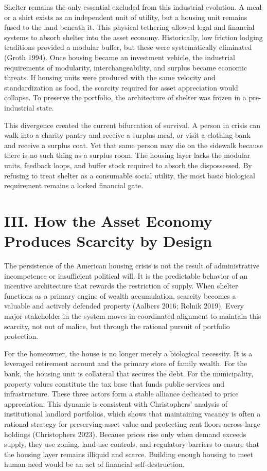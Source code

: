 \documentclass[
  12pt,
]{article}
\begin{document}
Shelter remains the only essential excluded from this industrial evolution. A meal or a shirt exists as an independent unit of utility, but a housing unit remains fused to the land beneath it. This physical tethering allowed legal and financial systems to absorb shelter into the asset economy. Historically, low friction lodging traditions provided a modular buffer, but these were systematically eliminated (Groth 1994). Once housing became an investment vehicle, the industrial requirements of modularity, interchangeability, and surplus became economic threats. If housing units were produced with the same velocity and standardization as food, the scarcity required for asset appreciation would collapse. To preserve the portfolio, the architecture of shelter was frozen in a pre-industrial state.

This divergence created the current bifurcation of survival. A person in crisis can walk into a charity pantry and receive a surplus meal, or visit a clothing bank and receive a surplus coat. Yet that same person may die on the sidewalk because there is no such thing as a surplus room. The housing layer lacks the modular units, feedback loops, and buffer stock required to absorb the dispossessed. By refusing to treat shelter as a consumable social utility, the most basic biological requirement remains a locked financial gate.

\hypertarget{iii.-how-the-asset-economy-produces-scarcity-by-design}{%
\section{III. How the Asset Economy Produces Scarcity by Design}\label{iii.-how-the-asset-economy-produces-scarcity-by-design}}

The persistence of the American housing crisis is not the result of administrative incompetence or insufficient political will. It is the predictable behavior of an incentive architecture that rewards the restriction of supply. When shelter functions as a primary engine of wealth accumulation, scarcity becomes a valuable and actively defended property (Aalbers 2016; Rolnik 2019). Every major stakeholder in the system moves in coordinated alignment to maintain this scarcity, not out of malice, but through the rational pursuit of portfolio protection.

For the homeowner, the house is no longer merely a biological necessity. It is a leveraged retirement account and the primary store of family wealth. For the bank, the housing unit is collateral that secures the debt. For the municipality, property values constitute the tax base that funds public services and infrastructure. These three actors form a stable alliance dedicated to price appreciation. This dynamic is consistent with Christophers' analysis of institutional landlord portfolios, which shows that maintaining vacancy is often a rational strategy for preserving asset value and protecting rent floors across large holdings (Christophers 2023). Because prices rise only when demand exceeds supply, they use zoning, land-use controls, and regulatory barriers to ensure that the housing layer remains illiquid and scarce. Building enough housing to meet human need would be an act of financial self-destruction.
\end{document}
